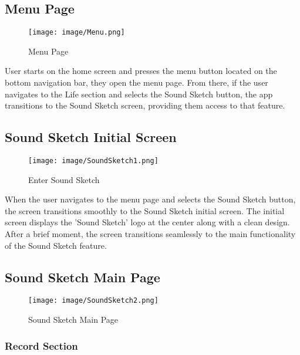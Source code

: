 \documentclass[conference]{IEEEtran}
\begin{document}
\subsection{Menu Page}

\begin{figure}[h!]
    \centering
    \texttt{[image: image/Menu.png]}
    \caption{Menu Page}
    \label{fig:enter-label}
\end{figure}

\noindent User starts on the home screen and presses the menu button located on the bottom navigation bar, they open the menu page. From there, if the user navigates to the Life section and selects the Sound Sketch button, the app transitions to the Sound Sketch screen, providing them access to that feature. \\

\subsection{Sound Sketch Initial Screen}


\begin{figure}[h!]
    \centering
    \texttt{[image: image/SoundSketch1.png]}
    \caption{Enter Sound Sketch}
    \label{fig:enter-label}
\end{figure}

\noindent 
When the user navigates to the menu page and selects the Sound Sketch button, the screen transitions smoothly to the Sound Sketch initial screen. The initial screen displays the 'Sound Sketch' logo at the center along with a clean design. After a brief moment, the screen transitions seamlessly to the main functionality of the Sound Sketch feature. \\

\subsection{Sound Sketch Main Page}

\begin{figure}[h!]
    \centering
    \texttt{[image: image/SoundSketch2.png]}
    \caption{Sound Sketch Main Page}
    \label{fig:enter-label}
\end{figure}

\subsubsection{Record Section}
\end{document}
